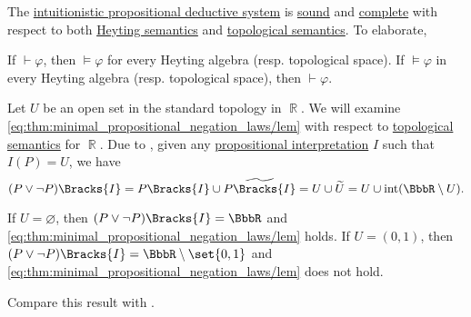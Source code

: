 \begin{theorem}\label{thm:intuitionistic_propositional_logic_is_sound_and_complete}
  The \hyperref[def:intuitionistic_propositional_deductive_systems]{intuitionistic propositional deductive system} is \hyperref[def:derivability_and_satisfiability/soundness]{sound} and \hyperref[def:derivability_and_satisfiability/completeness]{complete} with respect to both \hyperref[def:propositional_heyting_algebra_semantics]{Heyting semantics} and \hyperref[def:propositional_topological_semantics]{topological semantics}. To elaborate,
  \begin{thmenum}
     If \( \vdash \varphi \), then \( \vDash \varphi \) for every Heyting algebra (resp. topological space).
     If \( \vDash \varphi \) in every Heyting algebra (resp. topological space), then \( \vdash \varphi \).
  \end{thmenum}
\end{theorem}

\begin{example}\label{ex:topological_semantics_lem_counterexample}
  Let \( U \) be an open set in the standard topology in \( \BbbR \). We will examine \eqref{eq:thm:minimal_propositional_negation_laws/lem} with respect to \hyperref[def:propositional_topological_semantics]{topological semantics} for \( \BbbR \). Due to , given any \hyperref[def:propositional_valuation]{propositional interpretation} \( I \) such that \( I(P) = U \), we have
  \begin{equation*}
    (P \vee \neg P)\Bracks{I}
    =
    P\Bracks{I} \cup \widetilde{P\Bracks{I}}
    =
    U \cup \widetilde{U}
    =
    U \cup \Int(\BbbR \setminus U).
  \end{equation*}

  If \( U = \varnothing \), then \( (P \vee \neg P)\Bracks{I} = \BbbR \) and \eqref{eq:thm:minimal_propositional_negation_laws/lem} holds. If \( U = (0, 1) \), then \( (P \vee \neg P)\Bracks{I} = \BbbR \setminus \set{ 0, 1 } \) and \eqref{eq:thm:minimal_propositional_negation_laws/lem} does not hold.

  Compare this result with .
\end{example}

